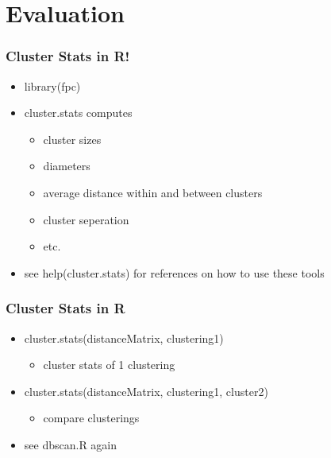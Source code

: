 \documentclass[bigger]{beamer}
\begin{document}
\section{Evaluation}
\label{sec-4}
\begin{frame}
\frametitle{Cluster Stats in R!}
\label{sec-4-1}


\begin{itemize}
\item library(fpc)
\item cluster.stats computes
\begin{itemize}
\item cluster sizes
\item diameters
\item average distance within and between clusters
\item cluster seperation
\item etc.
\end{itemize}
\item see help(cluster.stats) for references on how to use these tools
\end{itemize}
\end{frame}
\begin{frame}
\frametitle{Cluster Stats in R}
\label{sec-4-2}


\begin{itemize}
\item cluster.stats(distanceMatrix, clustering1)
\begin{itemize}
\item cluster stats of 1 clustering
\end{itemize}
\item cluster.stats(distanceMatrix, clustering1, cluster2)
\begin{itemize}
\item compare clusterings
\end{itemize}
\item see dbscan.R again
\end{itemize}
\end{frame}
\end{document}
